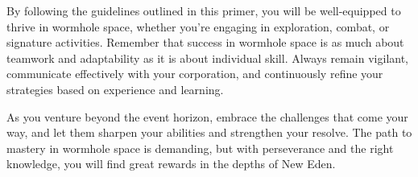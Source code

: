\documentclass[a4paper,12pt]{article}
\begin{document}
By following the guidelines outlined in this primer, you will be well-equipped to thrive in wormhole space, whether you're engaging in exploration, combat, or signature activities. Remember that success in wormhole space is as much about teamwork and adaptability as it is about individual skill. Always remain vigilant, communicate effectively with your corporation, and continuously refine your strategies based on experience and learning.

As you venture beyond the event horizon, embrace the challenges that come your way, and let them sharpen your abilities and strengthen your resolve. The path to mastery in wormhole space is demanding, but with perseverance and the right knowledge, you will find great rewards in the depths of New Eden.
\end{document}
